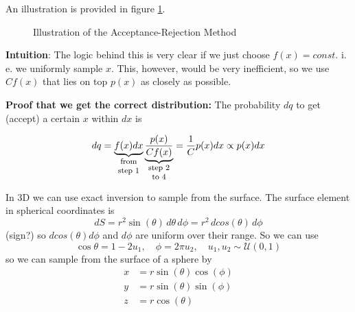 An illustration is provided in figure \ref{fig:acceptance_rejection}.

\begin{figure}[!htb]
 \centering
 \hfill
 \caption{Illustration of the Acceptance-Rejection Method}
 \label{fig:acceptance_rejection}
\end{figure}
 
\textbf{Intuition}: The logic behind this is very clear if we just choose $f(x)=const$. i. e. we uniformly sample $x$. This, however, would be very inefficient, so we use $ C f(x)$ that lies on top $p(x)$ as closely as possible.
\par
\textbf{Proof that we get the correct distribution:} The probability $dq$ to get (accept) a certain $x$ within $dx$ is

\begin{equation}
    dq = \explain{f(x) dx}{from step 1} \explain{\frac{p(x)}{C f(x)}}{step 2 to 4} = \frac{1}{C} p(x) dx \propto p(x) dx
\end{equation}


In 3D we can use exact inversion to sample from the surface. The surface element in spherical coordinates is
\begin{equation}
    dS = r^2 \sin(\theta) \, d\theta \, d\phi = r^2 \, d cos(\theta) \, d\phi
\end{equation}
(sign?) so $d cos(\theta) d\phi$ and $d \phi$ are uniform over their range. So we can use
\begin{equation}
    \cos \theta = 1 - 2u_1, \quad \phi = 2\pi u_2, \quad u_1, u_2 \sim \mathcal{U}(0,1)
\end{equation}
so we can sample from the surface of a sphere by
\begin{equation}
    \begin{aligned}
        x &= r \sin(\theta) \cos(\phi) \\
        y &= r \sin(\theta) \sin(\phi) \\
        z &= r \cos(\theta)
    \end{aligned}
\end{equation}

